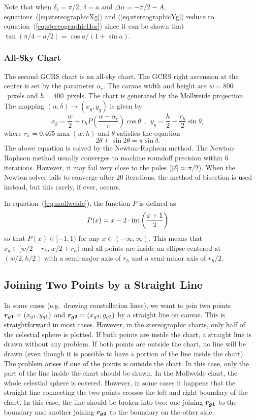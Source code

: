 \documentclass[12pt]{article}
\newcommand \beq {\begin{equation}}
\newcommand \eeq {\end{equation}}
\newcommand{\ve}[1]{\mbox{\boldmath $#1$}}
\begin{document}
Note that when $\delta_c=\pi/2$, $\delta = a$ and $\Delta \alpha = -\pi/2 - A$, 
equations~(\ref{eq:stereographicXg}) and (\ref{eq:stereographicYg}) reduce 
to equation~(\ref{eq:stereographicHor}) since it can be shown that 
$\tan(\pi/4 - a/2) = \cos a/(1+\sin a)$.

\subsubsection{All-Sky Chart} 

The second GCRS chart is an all-sky chart. The GCRS right ascension at the center 
is set by the parameter $\alpha_c$. The canvas width and height are $w=800$~pixels 
and $h=400$~pixels. The chart is generated by the Mollweide 
projection. The mapping $(\alpha, \delta) \rightarrow (x_g,y_g)$ is given by 
\beq
  x_g = \frac{w}{2} - r_h P\left( \frac{\alpha-\alpha_c}{\pi}\right) \cos \theta 
\ \ , \ \ y_g = \frac{h}{2} - \frac{r_h}{2} \sin \theta , 
\label{eq:mollweide}
\eeq
where $r_h = 0.465\max(w,h)$ and $\theta$ satisfies the equation 
\beq
  2\theta + \sin 2\theta = \pi \sin \delta .
\eeq 
The above equation is solved by the Newton-Raphson method. The Newton-Raphson 
method usually converges to machine roundoff precision within 6 iterations. 
However, it may fail very close to the poles ($|\delta|\approx \pi/2$). 
When the Newton solver fails to converge after 20 iterations, the method 
of bisection is used instead, but this rarely, if ever, occurs.

In equation~(\ref{eq:mollweide}), the function $P$ is defined as 
\beq
  P(x) = x - 2 \cdot {\rm int}\left( \frac{x+1}{2} \right) 
\eeq
so that $P(x) \in [-1,1)$ for any $x\in (-\infty, \infty)$.
This means that $x_g \in [w/2 - r_h, w/2 + r_h)$ and all points are inside 
an ellipse centered at $(w/2,h/2)$ with a semi-major axis of $r_h$ and 
a semi-minor axis of $r_h/2$.

\subsection{Joining Two Points by a Straight Line}

In some cases (e.g.\ drawing constellation lines), we want to join 
two points $\ve{r_{g1}}=(x_{g1},y_{g1})$ 
and $\ve{r_{g2}}=(x_{g2},y_{g2})$ by a straight line on canvas. 
This is straightforward in most cases. However, 
in the stereographic charts, only half of the celestial sphere is plotted. 
If both points are inside the chart, a straight line is drawn without any 
problem. If both points are outside the chart, no line will be drawn (even 
though it is possible to have a portion of the line inside the chart). 
The problem arises if one of the points is outside the chart. In this case, 
only the part of the line inside the chart should be drawn. In the Mollweide 
chart, the whole celestial sphere is covered. However, in some cases it happens 
that the straight line connecting the two points crosses the left and right 
boundary of the chart. In this case, the line should be broken into two: one 
joining $\ve{r_{g1}}$ to the boundary and another joining $\ve{r_{g2}}$ to the 
boundary on the other side. 
\end{document}
